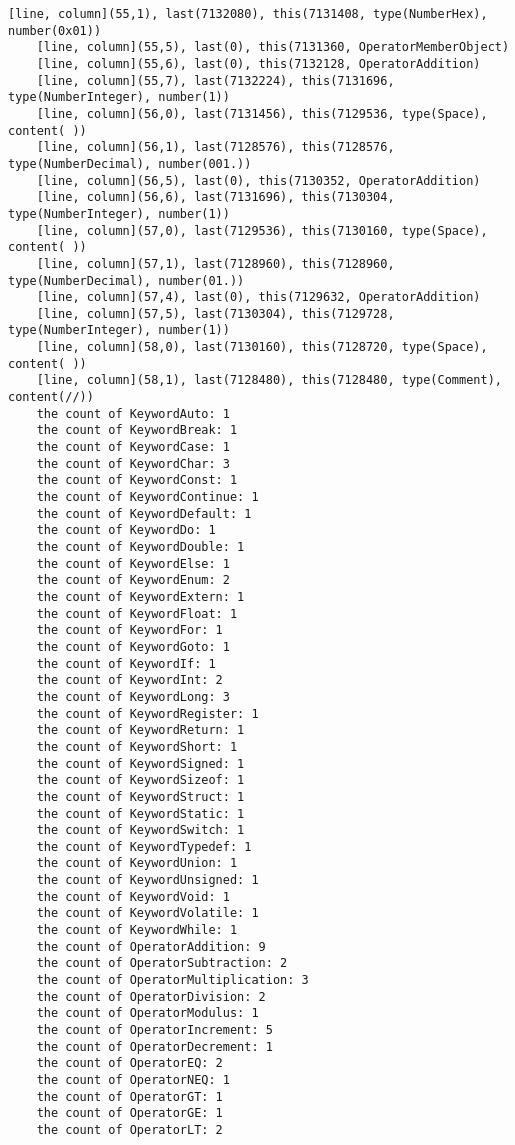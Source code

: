 \documentclass[UTF8]{ctexart}
\begin{document}
{\begin{lstlisting}[language={[ANSI]C++}]
    [line, column](55,1), last(7132080), this(7131408, type(NumberHex), number(0x01))
    [line, column](55,5), last(0), this(7131360, OperatorMemberObject)
    [line, column](55,6), last(0), this(7132128, OperatorAddition)
    [line, column](55,7), last(7132224), this(7131696, type(NumberInteger), number(1))
    [line, column](56,0), last(7131456), this(7129536, type(Space), content( ))
    [line, column](56,1), last(7128576), this(7128576, type(NumberDecimal), number(001.))
    [line, column](56,5), last(0), this(7130352, OperatorAddition)
    [line, column](56,6), last(7131696), this(7130304, type(NumberInteger), number(1))
    [line, column](57,0), last(7129536), this(7130160, type(Space), content( ))
    [line, column](57,1), last(7128960), this(7128960, type(NumberDecimal), number(01.))
    [line, column](57,4), last(0), this(7129632, OperatorAddition)
    [line, column](57,5), last(7130304), this(7129728, type(NumberInteger), number(1))
    [line, column](58,0), last(7130160), this(7128720, type(Space), content( ))
    [line, column](58,1), last(7128480), this(7128480, type(Comment), content(//))
    the count of KeywordAuto: 1
    the count of KeywordBreak: 1
    the count of KeywordCase: 1
    the count of KeywordChar: 3
    the count of KeywordConst: 1
    the count of KeywordContinue: 1
    the count of KeywordDefault: 1
    the count of KeywordDo: 1
    the count of KeywordDouble: 1
    the count of KeywordElse: 1
    the count of KeywordEnum: 2
    the count of KeywordExtern: 1
    the count of KeywordFloat: 1
    the count of KeywordFor: 1
    the count of KeywordGoto: 1
    the count of KeywordIf: 1
    the count of KeywordInt: 2
    the count of KeywordLong: 3
    the count of KeywordRegister: 1
    the count of KeywordReturn: 1
    the count of KeywordShort: 1
    the count of KeywordSigned: 1
    the count of KeywordSizeof: 1
    the count of KeywordStruct: 1
    the count of KeywordStatic: 1
    the count of KeywordSwitch: 1
    the count of KeywordTypedef: 1
    the count of KeywordUnion: 1
    the count of KeywordUnsigned: 1
    the count of KeywordVoid: 1
    the count of KeywordVolatile: 1
    the count of KeywordWhile: 1
    the count of OperatorAddition: 9
    the count of OperatorSubtraction: 2
    the count of OperatorMultiplication: 3
    the count of OperatorDivision: 2
    the count of OperatorModulus: 1
    the count of OperatorIncrement: 5
    the count of OperatorDecrement: 1
    the count of OperatorEQ: 2
    the count of OperatorNEQ: 1
    the count of OperatorGT: 1
    the count of OperatorGE: 1
    the count of OperatorLT: 2

\end{lstlisting}}
\end{document}
